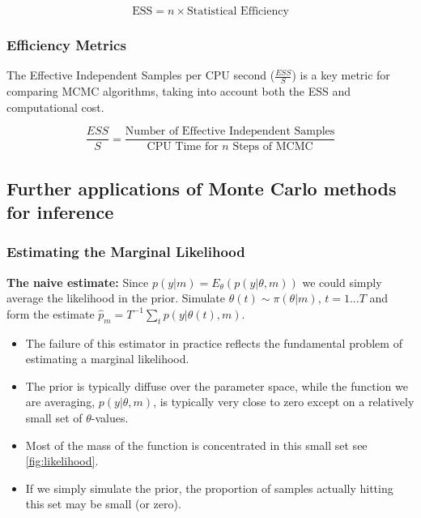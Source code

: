\documentclass{article}
\begin{document}
\begin{equation}
    \text{ESS} = n \times \text{Statistical Efficiency}
\end{equation}

\subsubsection{Efficiency Metrics}
The Effective Independent Samples per CPU second (\( \frac{ESS}{S} \)) is a key metric for comparing MCMC algorithms, taking into account both the ESS and computational cost.

\begin{equation}
    \frac{ESS}{S} = \frac{\text{Number of Effective Independent Samples}}{\text{CPU Time for } n \text{ Steps of MCMC}}
\end{equation}

\subsection{Further applications of Monte Carlo methods for inference
}
\subsubsection{Estimating the Marginal Likelihood}

\textbf{The naive estimate:} Since \( p(y|m) = E_\theta(p(y|\theta, m)) \) we could simply average the likelihood in the prior. Simulate \( \theta(t) \sim \pi(\theta|m) \), \( t = 1...T \) and form the estimate \( \hat{p}_m = T^{-1} \sum_{t} p(y|\theta(t), m) \).

\begin{itemize}
    \item The failure of this estimator in practice reflects the fundamental problem of estimating a marginal likelihood.
    \item The prior is typically diffuse over the parameter space, while the function we are averaging, \( p(y|\theta, m) \), is typically very close to zero except on a relatively small set of \( \theta \)-values.
    \item Most of the mass of the function is concentrated in this small set see \ref{fig:likelihood}.
    \item If we simply simulate the prior, the proportion of samples actually hitting this set may be small (or zero).
\end{itemize}
\end{document}
